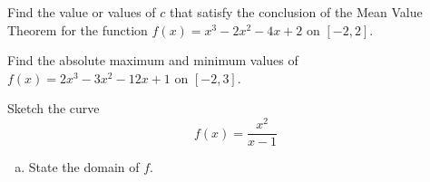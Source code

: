 \documentclass[12pt]{amsart}
\begin{document}
\newpage

\begin{thm}[15 Points]
  Find the value or values of $c$ that satisfy the conclusion of the Mean Value Theorem for the function $f(x)=x^3 - 2x^2 -4x + 2$ on $[-2,2]$.
\end{thm}

\vspace{3in}

\begin{thm}[15 Points]
  Find the absolute maximum and minimum values of $f(x)=2x^3 - 3x^2 -12x + 1$ on $[-2,3]$.
\end{thm}

\newpage

\begin{thm}[20 Points]
  Sketch the curve $$f(x)=\frac{x^2}{x-1}$$
  \begin{enumerate}[(a)]
  \item\label{sketching first step}
    State the domain of \(f\).
    \vspace{1in}
    

\end{enumerate}
\end{thm}
\end{document}
